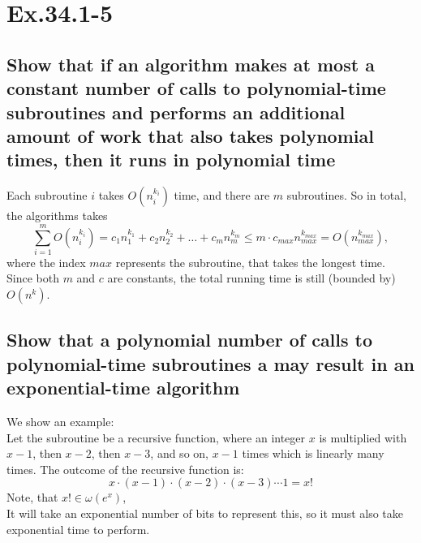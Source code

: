 \section*{Ex.34.1-5}
\subsection*{Show that if an algorithm makes at most a constant number of calls to polynomial-time subroutines and performs an additional amount of work that also takes polynomial times, then it runs in polynomial time}

Each subroutine $i$ takes $O(n^{k_i}_i)$ time, and there are $m$ subroutines. So in total, the algorithms takes
$$
\sum^m_{i=1} O(n^{k_i}_i) = c_1n^{k_1}_1 + c_2n^{k_2}_2 + \ldots + c_m n^{k_m}_m \leq m\cdot c_{max}n^{k_{max}}_{max} = O(n^{k_{max}}_{max}),
$$
where the index $max$ represents the subroutine, that takes the longest time.
\\
Since both $m$ and $c$ are constants, the total running time is still (bounded by) $O(n^k)$.

\subsection*{Show that a polynomial number of calls to polynomial-time subroutines a may result in an exponential-time algorithm}

We show an example:
\\
Let the subroutine be a recursive function, where an integer $x$ is multiplied with $x-1$, then $x-2$, then $x-3$, and so on, $x-1$ times which is linearly many times. The outcome of the recursive function is:
$$
x\cdot (x-1)\cdot (x-2)\cdot (x-3)\cdots 1 = x!
$$
Note, that $x!\in \omega(e^x)$,
\\
It will take an exponential number of bits to represent this, so it must also take exponential time to perform.